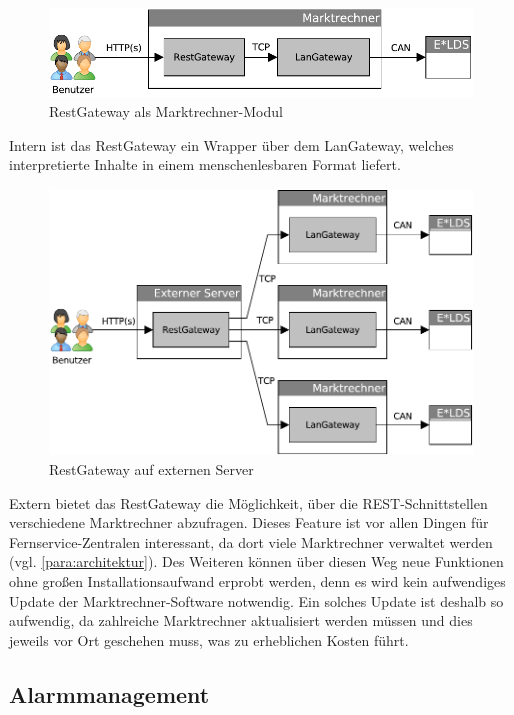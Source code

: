 \documentclass[11pt,a4paper]{report}
\begin{document}
\begin{figure}[htbp]
\centering
\includegraphics[scale=0.7]{images/RestGateway_intern.pdf}
\caption[]{RestGateway als Marktrechner-Modul}
\label{fig:rest_intern}
\end{figure}

Intern ist das RestGateway ein Wrapper über dem LanGateway, welches interpretierte Inhalte in einem menschenlesbaren Format liefert.

\begin{figure}[htbp]
\centering
\includegraphics[scale=0.7]{images/RestGateway_extern.pdf}
\caption[]{RestGateway auf externen Server}
\label{fig:rest_extern}
\end{figure}

Extern bietet das RestGateway die Möglichkeit, über die REST-Schnittstellen verschiedene Marktrechner abzufragen. Dieses Feature ist vor allen Dingen für Fernservice-Zentralen interessant, da dort viele Marktrechner verwaltet werden (vgl. \ref{para:architektur}). Des Weiteren können über diesen Weg neue Funktionen ohne großen Installationsaufwand erprobt werden, denn es wird kein aufwendiges Update der Marktrechner-Software notwendig. Ein solches Update ist deshalb so aufwendig, da zahlreiche Marktrechner aktualisiert werden müssen und dies jeweils vor Ort geschehen muss, was zu erheblichen Kosten führt.

\subsection{Alarmmanagement} 
\end{document}
